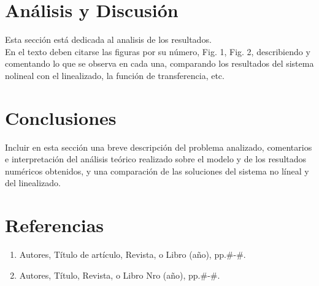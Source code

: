 \documentclass[11pt, a4paper]{article}
\begin{document}
\section{Análisis y Discusión}
Esta sección está dedicada al analisis de los resultados.\\
En el texto deben citarse las figuras por su número, Fig. 1, Fig. 2, describiendo y comentando lo que se observa en cada una, comparando los resultados del sistema nolineal con el linealizado, la función de transferencia, etc.

\section{Conclusiones}
Incluir en esta sección una breve descripción del problema analizado, comentarios e interpretación del análisis teórico realizado sobre el modelo y de los resultados numéricos obtenidos, y una comparación de las soluciones del sistema no líneal y del linealizado.

\section{Referencias}
\begin{enumerate}
    \item Autores, Título de artículo, Revista, o Libro (año), pp.\#-\#.
    \item Autores, Título, Revista, o Libro Nro (año), pp.\#-\#.
\end{enumerate}
\end{document}
